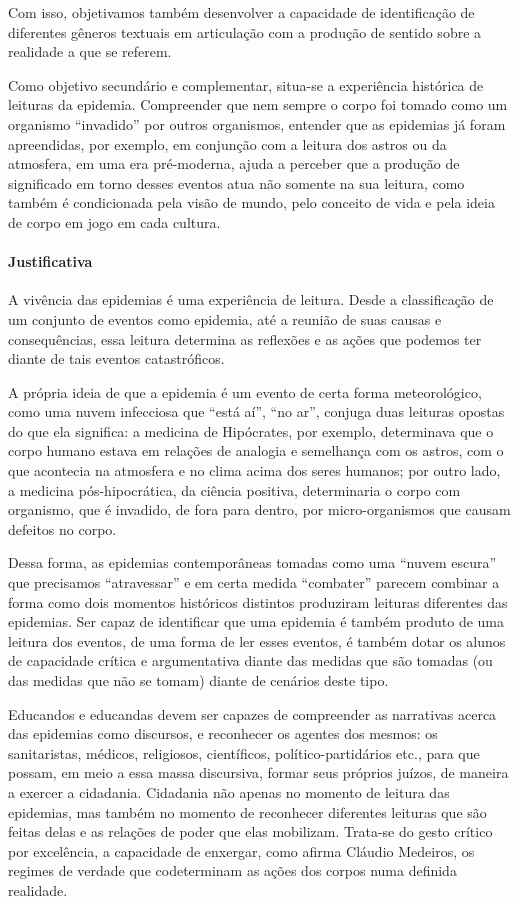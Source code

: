 \documentclass[12pt]{extarticle}
\begin{document}
Com isso, objetivamos também desenvolver a capacidade de identificação
de diferentes gêneros textuais em articulação com a produção de sentido
sobre a realidade a que se referem.

Como objetivo secundário e complementar, situa-se a experiência
histórica de leituras da epidemia. Compreender que nem sempre o corpo
foi tomado como um organismo ``invadido'' por outros organismos,
entender que as epidemias já foram apreendidas, por exemplo, em
conjunção com a leitura dos astros ou da atmosfera, em uma era
pré-moderna, ajuda a perceber que a produção de significado em torno
desses eventos atua não somente na sua leitura, como também é
condicionada pela visão de mundo, pelo conceito de vida e pela ideia de
corpo em jogo em cada cultura.

\paragraph{Justificativa}

A vivência das epidemias é uma experiência de leitura. Desde a
classificação de um conjunto de eventos como epidemia, até a reunião de
suas causas e consequências, essa leitura determina as reflexões e as
ações que podemos ter diante de tais eventos catastróficos.

A própria ideia de que a epidemia é um evento de certa forma
meteorológico, como uma nuvem infecciosa que ``está aí'', ``no ar'',
conjuga duas leituras opostas do que ela significa: a medicina de
Hipócrates, por exemplo, determinava que o corpo humano estava em
relações de analogia e semelhança com os astros, com o que acontecia na
atmosfera e no clima acima dos seres humanos; por outro lado, a medicina
pós-hipocrática, da ciência positiva, determinaria o corpo com
organismo, que é invadido, de fora para dentro, por micro-organismos que
causam defeitos no corpo.

Dessa forma, as epidemias contemporâneas tomadas como uma ``nuvem
escura'' que precisamos ``atravessar'' e em certa medida ``combater''
parecem combinar a forma como dois momentos históricos distintos
produziram leituras diferentes das epidemias. Ser capaz de identificar
que uma epidemia é também produto de uma leitura dos eventos, de uma
forma de ler esses eventos, é também dotar os alunos de capacidade
crítica e argumentativa diante das medidas que são tomadas (ou das
medidas que não se tomam) diante de cenários deste tipo.

Educandos e educandas devem ser capazes de compreender as narrativas
acerca das epidemias como discursos, e reconhecer os agentes dos mesmos:
os sanitaristas, médicos, religiosos, científicos, político-partidários
etc., para que possam, em meio a essa massa discursiva, formar seus
próprios juízos, de maneira a exercer a cidadania. Cidadania não apenas
no momento de leitura das epidemias, mas também no momento de reconhecer
diferentes leituras que são feitas delas e as relações de poder que elas
mobilizam. Trata-se do gesto crítico por excelência, a capacidade de
enxergar, como afirma Cláudio Medeiros, os regimes de verdade que
codeterminam as ações dos corpos numa definida realidade.
\end{document}
